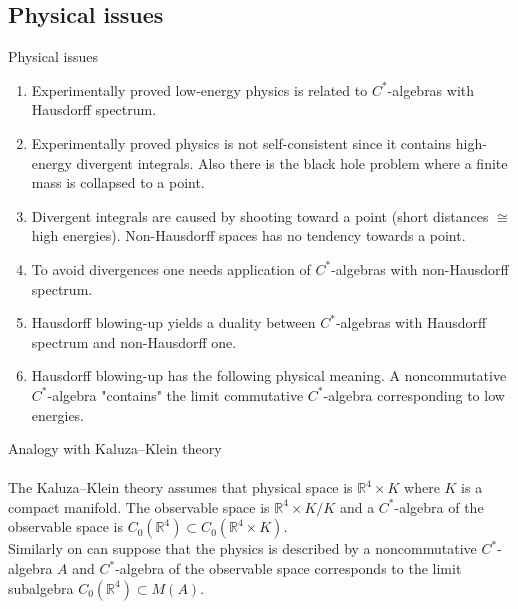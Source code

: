 \documentclass{beamer}
\theoremstyle{plain}
\newcommand{\Rb}{\mathbb{R}}
\begin{document}
\begin{frame}
\section{Physical issues}
\centering\huge{Physical issues} \normalsize
$~$\\
\begin{enumerate}
	\item 	Experimentally proved low-energy physics is related to $C^*$-algebras with Hausdorff spectrum.
	\item 		Experimentally proved physics is not self-consistent since it contains high-energy  divergent integrals. Also there is the \alert{black hole problem} where a finite mass is collapsed to a point.
	\item Divergent integrals are caused by shooting toward a point (short distances $\cong$ high energies). Non-Hausdorff spaces has no tendency towards a point.
	\item To avoid divergences one needs application of $C^*$-algebras with non-Hausdorff spectrum.
	\item Hausdorff blowing-up yields a duality between $C^*$-algebras with Hausdorff spectrum and non-Hausdorff one.
	\item Hausdorff blowing-up has the following physical meaning. A noncommutative $C^*$-algebra "contains" the \alert{limit} commutative $C^*$-algebra corresponding to low energies.
\end{enumerate}
\end{frame}
\begin{frame}
	\huge{Analogy with Kaluza–Klein theory} \normalsize
	$~$\\
	$~$\\
The Kaluza–Klein theory assumes that physical space  is $\Rb^4 \times K$ where $K$ is a compact manifold. The \alert{observable  space} is $\Rb^4 \times K/K$ and a $C^*$-algebra of the  \alert{observable  space}  is $C_0\left(\Rb^4 \right) \subset C_0\left(\Rb^4 \times K\right)$.
\\
Similarly on can suppose that the physics is described by a noncommutative $C^*$-algebra $A$ and  $C^*$-algebra of the  \alert{observable  space}  corresponds to the \alert{limit subalgebra} $C_0\left( \Rb^4\right) \subset M\left( A\right)$.
	
	\end{frame}
\end{document}
